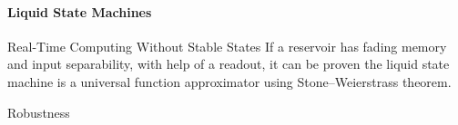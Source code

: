 \documentclass{scrartcl}
\theoremstyle{definition}
\theoremstyle{remark}
\begin{document}
\paragraph{Liquid State Machines}%
Real-Time Computing Without Stable States \citep{maass2002real}
If a reservoir has fading memory and input separability, with help of a readout, it can be proven the liquid state machine is a universal function approximator using Stone–Weierstrass theorem\citep{maass2004computationalpower}.

Robustness \citep{hazan2012topological}

 \newpage
 
 
\end{document}

